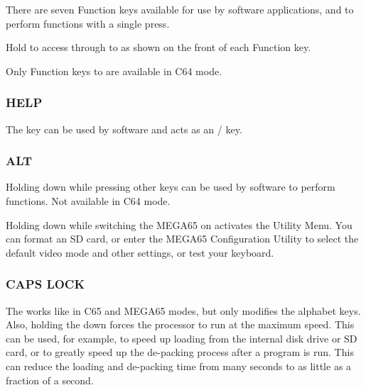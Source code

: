 There are seven Function keys available for use by software applications,       and  to perform functions with a single press.

Hold  to access  through to  as shown on the front of each Function key.

Only Function keys  to  are available in C64 mode.

\subsubsection{HELP}

The  key can be used by software and acts as an  /  key.

\subsubsection{ALT}

Holding  down while pressing other keys can be used by software to perform functions. Not available in C64 mode.

Holding  down while switching the MEGA65 on activates the Utility Menu. You can format an SD card, or enter the MEGA65 Configuration Utility to select the default video mode and other settings, or test your keyboard.

\subsubsection{CAPS LOCK}

The  works like  in C65 and MEGA65 modes, but only modifies the alphabet keys.
Also, holding the  down forces the processor to run at the maximum speed. This can be used, for example,
to speed up loading from the internal disk drive or SD card, or to greatly speed up the de-packing process after a program is run.
This can reduce the loading and de-packing time from many seconds to as little as a fraction of a second.
